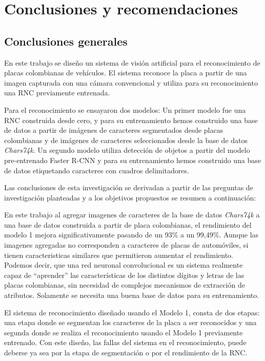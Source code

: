 \chapter{Conclusiones y recomendaciones}

\section*{Conclusiones generales}

En este trabajo se diseño un sistema de visión artificial para el reconocimiento de placas colombianas de vehículos. El sistema reconoce la placa a partir de una imagen capturada con una cámara convencional y utiliza para su reconocimiento una RNC previamente entrenada. 

Para el reconocimiento se ensayaron dos modelos: Un primer modelo fue una RNC construida desde cero, y para su entrenamiento hemos construido una base de datos a partir de imágenes de caracteres segmentados desde placas colombianas y de imágenes de caracteres seleccionados desde la base de datos \textit{Chars74k}. Un segundo modelo utiliza detección de objetos a partir del modelo pre-entrenado Faster R-CNN y para su entrenamiento hemos construido una base de datos etiquetando caracteres con cuadros delimitadores.   

Las conclusiones de esta investigación se derivadan a partir de las preguntas de investigación planteadas y a los objetivos propuestos se resumen a continuación:

En este trabajo al agregar imagenes de caracteres de la base de datos \textit{Chars74k} a una base de datos construida a partir de placa colombianas, el rendimiento del modelo 1 mejora significativamente pasando de un 93\% a un 99,49\%. Aunque las imagenes agregadas no corresponden a caracteres de placas de automóviles, si tienen caracteristicas similares que permitieron aumentar el rendimiento. Podemos decir, que una red neuronal convolucional es un sistema realmente capaz de “aprender” las características de los distintos dígitos y letras de las placas colombianas, sin necesidad de complejos mecanismos de extracción de atributos. Solamente se necesita una buena base de datos para su entrenamiento.

El sistema de reconocimiento diseñado usando el Modelo 1, consta de dos etapas: una etapa donde se segmentan los caracteres de la placa a ser reconocidos y una segunda donde se realiza el reconocimiento usando el Modelo 1 previamente entrenado. Con este diseño, las fallas del sistema en el reconocimiento, puede deberse ya sea por la etapa de segmentación o por el rendimiento de la RNC. 

